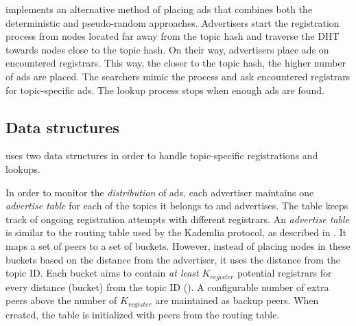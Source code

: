 \sysname implements an alternative method of placing ads that combines both the deterministic and pseudo-random approaches.
Advertisers start the registration process from nodes located far away from the topic hash and traverse the DHT towards nodes close to the topic hash.
On their way, advertisers place ads on encountered registrars.
This way, the closer to the topic hash, the higher number of ads are placed.
The searchers mimic the process and ask encountered registrars for topic-specific ads.
The lookup process stops when enough ads are found.

\subsection{Data structures}
\label{sec:struct}

\sysname uses two data structures in order to handle topic-specific registrations and lookups. 

In order to monitor the \emph{distribution} of ads, each advertiser maintains one \emph{advertise table} for each of the topics it belongs to and advertises.
The table keeps track of ongoing registration attempts with different registrars.
An \emph{advertise table} is similar to the routing table used by the Kademlia protocol, as described in .
It maps a set of peers to a set of buckets.
However, instead of placing nodes in these buckets based on the distance from the advertiser, it uses the distance from the topic ID.
Each bucket aims to contain \emph{at least} $K_\textit{register}$ potential registrars for every distance (bucket) from the topic ID ().
A configurable number of extra peers above the number of $K_\textit{register}$ are maintained as backup peers.
When created, the table is initialized with peers from the routing table.


